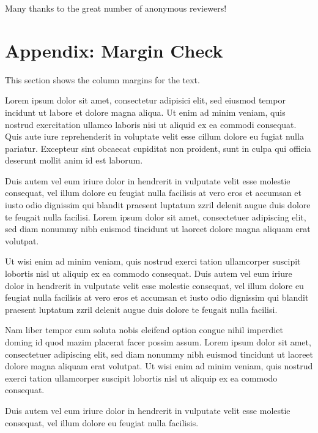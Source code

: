 \documentclass[a4paper]{article}
\begin{document}
Many thanks to the great number of anonymous reviewers!

\nocite{*}


\section{Appendix: Margin Check}

This section shows the column margins for the text.

Lorem ipsum dolor sit amet, consectetur adipisici elit, sed eiusmod tempor
incidunt ut labore et dolore magna aliqua. Ut enim ad minim veniam, quis
nostrud exercitation ullamco laboris nisi ut aliquid ex ea commodi consequat.
Quis aute iure reprehenderit in voluptate velit esse cillum dolore eu fugiat
nulla pariatur. Excepteur sint obcaecat cupiditat non proident, sunt in culpa
qui officia deserunt mollit anim id est laborum.

Duis autem vel eum iriure dolor in hendrerit in vulputate velit esse molestie
consequat, vel illum dolore eu feugiat nulla facilisis at vero eros et accumsan
et iusto odio dignissim qui blandit praesent luptatum zzril delenit augue duis
dolore te feugait nulla facilisi. Lorem ipsum dolor sit amet, consectetuer
adipiscing elit, sed diam nonummy nibh euismod tincidunt ut laoreet dolore
magna aliquam erat volutpat.

Ut wisi enim ad minim veniam, quis nostrud exerci tation ullamcorper suscipit
lobortis nisl ut aliquip ex ea commodo consequat. Duis autem vel eum iriure
dolor in hendrerit in vulputate velit esse molestie consequat, vel illum dolore
eu feugiat nulla facilisis at vero eros et accumsan et iusto odio dignissim qui
blandit praesent luptatum zzril delenit augue duis dolore te feugait nulla
facilisi.

Nam liber tempor cum soluta nobis eleifend option congue nihil imperdiet doming
id quod mazim placerat facer possim assum. Lorem ipsum dolor sit amet,
consectetuer adipiscing elit, sed diam nonummy nibh euismod tincidunt ut
laoreet dolore magna aliquam erat volutpat. Ut wisi enim ad minim veniam, quis
nostrud exerci tation ullamcorper suscipit lobortis nisl ut aliquip ex ea
commodo consequat.

Duis autem vel eum iriure dolor in hendrerit in vulputate velit esse molestie
consequat, vel illum dolore eu feugiat nulla facilisis.
\end{document}
